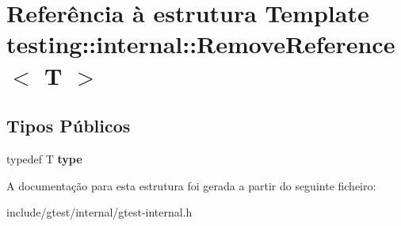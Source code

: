 \hypertarget{structtesting_1_1internal_1_1RemoveReference}{\section{Referência à estrutura Template testing\-:\-:internal\-:\-:Remove\-Reference$<$ T $>$}
\label{structtesting_1_1internal_1_1RemoveReference}
}
\subsection*{Tipos Públicos}
\begin{DoxyCompactItemize}
\item 
\hypertarget{structtesting_1_1internal_1_1RemoveReference_a9ca4f6499579225f7986b789ee4b2895}{typedef T {\bfseries type}}\label{structtesting_1_1internal_1_1RemoveReference_a9ca4f6499579225f7986b789ee4b2895}

\end{DoxyCompactItemize}


A documentação para esta estrutura foi gerada a partir do seguinte ficheiro\-:\begin{DoxyCompactItemize}
\item 
include/gtest/internal/gtest-\/internal.\-h\end{DoxyCompactItemize}
